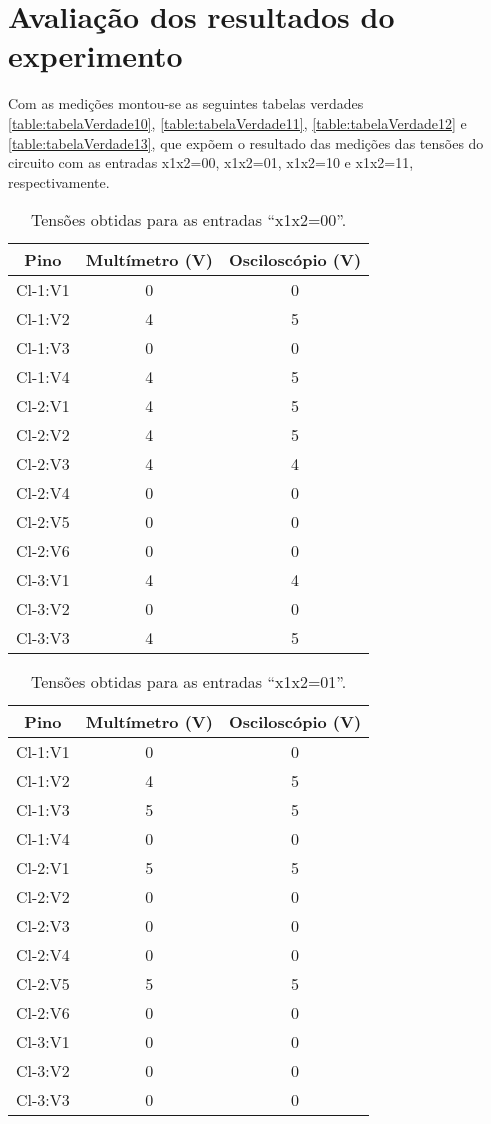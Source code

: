 \chapter{Avaliação dos resultados do experimento}
	Com as medições montou-se as seguintes tabelas verdades \autoref{table:tabelaVerdade10},
	 \autoref{table:tabelaVerdade11}, \autoref{table:tabelaVerdade12} e
	 \autoref{table:tabelaVerdade13}, que expõem o resultado das medições das tensões do circuito
	 com as entradas x1x2=00, x1x2=01, x1x2=10 e x1x2=11, respectivamente.

	 \begin{table}[H]
 		\centering
 		\caption{Tensões obtidas para as entradas “x1x2=00”.}
 		\label{table:tabelaVerdade10}
 		\begin{tabular}{c|c|c}
 			\textbf{Pino} & \textbf{Multímetro (V)} & \textbf{Osciloscópio (V)}\\
 			\hline
 			Cl-1:V1 & 0 & 0 \\
 			Cl-1:V2 & 4 & 5 \\
 			Cl-1:V3 & 0 & 0 \\
 			Cl-1:V4 & 4 & 5 \\
 			\hline
 			Cl-2:V1 & 4 & 5 \\
 			Cl-2:V2 & 4 & 5 \\
 			Cl-2:V3 & 4 & 4 \\
 			Cl-2:V4 & 0 & 0 \\
 			Cl-2:V5 & 0 & 0 \\
 			Cl-2:V6 & 0 & 0 \\
 			\hline
 			Cl-3:V1 & 4 & 4 \\
 			Cl-3:V2 & 0 & 0 \\
 			Cl-3:V3 & 4 & 5 \\
 		\end{tabular}
 	\end{table}

 	\begin{table}[H]
 		\centering
 		\caption{Tensões obtidas para as entradas “x1x2=01”.}
 		\label{table:tabelaVerdade11}
 		\begin{tabular}{c|c|c}
 			\textbf{Pino} & \textbf{Multímetro (V)} & \textbf{Osciloscópio (V)}\\
 			\hline
 			Cl-1:V1 & 0 & 0 \\
 			Cl-1:V2 & 4 & 5 \\
 			Cl-1:V3 & 5 & 5 \\
 			Cl-1:V4 & 0 & 0 \\
 			\hline
 			Cl-2:V1 & 5 & 5 \\
 			Cl-2:V2 & 0 & 0 \\
 			Cl-2:V3 & 0 & 0 \\
 			Cl-2:V4 & 0 & 0 \\
 			Cl-2:V5 & 5 & 5 \\
 			Cl-2:V6 & 0 & 0 \\
 			\hline
 			Cl-3:V1 & 0 & 0 \\
 			Cl-3:V2 & 0 & 0 \\
 			Cl-3:V3 & 0 & 0 \\
 		\end{tabular}
 	\end{table}

